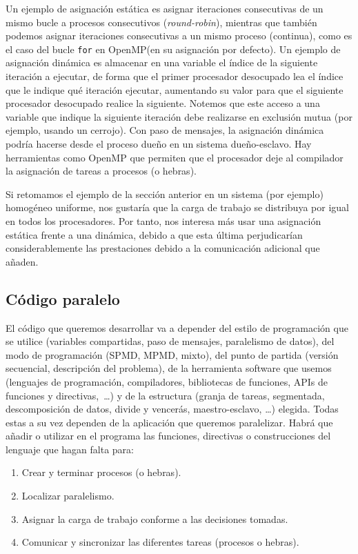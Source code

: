 Un ejemplo de asignación estática es asignar iteraciones consecutivas de un mismo bucle a procesos consecutivos (\textit{round-robin}), mientras que también podemos asignar iteraciones consecutivas a un mismo proceso (continua), como es el caso del bucle \verb|for| en OpenMP\@ (en su asignación por defecto). Un ejemplo de asignación dinámica es almacenar en una variable el índice de la siguiente iteración a ejecutar, de forma que el primer procesador desocupado lea el índice que le indique qué iteración ejecutar, aumentando su valor para que el siguiente procesador desocupado realice la siguiente. Notemos que este acceso a una variable que indique la siguiente iteración debe realizarse en exclusión mutua (por ejemplo, usando un cerrojo). Con paso de mensajes, la asignación dinámica podría hacerse desde el proceso dueño en un sistema dueño-esclavo. Hay herramientas como OpenMP que permiten que el procesador deje al compilador la asignación de tareas a procesos (o hebras).

\begin{ejemplo}
    Si retomamos el ejemplo de la sección anterior en un sistema (por ejemplo) homogéneo uniforme, nos gustaría que la carga de trabajo se distribuya por igual en todos los procesadores. Por tanto, nos interesa más usar una asignación estática frente a una dinámica, debido a que esta última perjudicarían considerablemente las prestaciones debido a la comunicación adicional que añaden.
\end{ejemplo}
\subsection{Código paralelo}
El código que queremos desarrollar va a depender del estilo de programación que se utilice (variables compartidas, paso de mensajes, paralelismo de datos), del modo de programación (SPMD, MPMD, mixto), del punto de partida (versión secuencial, descripción del problema), de la herramienta software que usemos (lenguajes de programación, compiladores, bibliotecas de funciones, APIs de funciones y directivas,~\ldots) y de la estructura (granja de tareas, segmentada, descomposición de datos, divide y vencerás, maestro-esclavo, \ldots) elegida. Todas estas a su vez dependen de la aplicación que queremos paralelizar.
Habrá que añadir o utilizar en el programa las funciones, directivas o construcciones del lenguaje que hagan falta para:
\begin{enumerate}
    \item Crear y terminar procesos (o hebras).
    \item Localizar paralelismo.
    \item Asignar la carga de trabajo conforme a las decisiones tomadas.
    \item Comunicar y sincronizar las diferentes tareas (procesos o hebras).
\end{enumerate}


